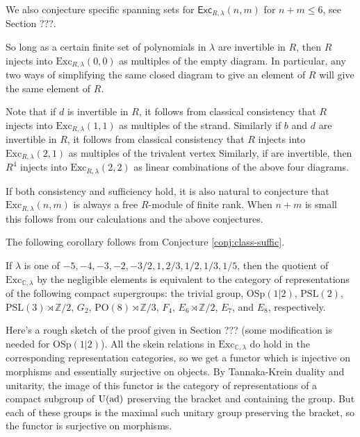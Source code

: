 \documentclass[12pt]{amsart}
\begin{document}
We also conjecture specific spanning sets for $\mathsf{Exc}_{R,\lambda}(n,m)$ for $n+m \leq 6$, see Section ???.

\begin{conjecture}
  \label{conj:class-consist}
So long as a certain finite set of polynomials in $\lambda$ are invertible in $R$, then $R$ injects into $\mathrm{Exc}_{R,\lambda}(0,0)$ as multiples of the empty diagram.  In particular, any two ways of simplifying the same closed diagram to give an element of $R$ will give the same element of $R$.
\end{conjecture}

Note that if $d$ is invertible in $R$, it follows from classical consistency that $R$ injects into $\mathrm{Exc}_{R,\lambda}(1,1)$ as multiples of the strand.  Similarly if $b$ and $d$ are invertible in $R$, it follows from classical consistency that $R$ injects into $\mathrm{Exc}_{R,\lambda}(2,1)$ as multiples of the trivalent vertex  Similarly, if  are invertible, then $R^4$ injects into $\mathrm{Exc}_{R,\lambda}(2,2)$ as linear combinations of the above four diagrams.


If both consistency and sufficiency hold, it is also natural to conjecture that $\mathrm{Exc}_{R,\lambda}(n,m)$ is always a free $R$-module of finite rank.  When $n+m$ is small this follows from our calculations and the above conjectures.

The following corollary follows from Conjecture \ref{conj:class-suffic}.

\begin{corollary}
If $\lambda$ is one of $-5, -4, -3, -2, -3/2,1,2/3,1/2, 1/3, 1/5$, then the quotient of $\mathrm{Exc}_{\mathbb{C},\lambda}$ by the negligible elements is equivalent to the category of representations of the following compact supergroups: the trivial group, $\mathrm{OSp}(1 | 2)$, $\mathrm{PSL}(2)$, $\mathrm{PSL}(3) \rtimes \mathbb{Z}/2$, $G_2$, $\mathrm{PO}(8) \rtimes \mathbb{Z}/3$, $F_4$, $E_6 \rtimes \mathbb{Z}/2$, $E_7$, and $E_8$, respectively.
\end{corollary}

Here's a rough sketch of the proof given in Section ??? (some modification is needed for $\mathrm{OSp}(1|2)$).  All the skein relations in $\mathrm{Exc}_{\mathbb{C},\lambda}$ do hold in the corresponding representation categories, so we get a functor which is injective on morphisms and essentially surjective on objects.  By Tannaka-Krein duality and unitarity, the image of this functor is the category of representations of a compact subgroup of $\mathrm{U}(\operatorname{ad})$ preserving the bracket and containing the group.  But each of these groups is the maximal such unitary group preserving the bracket, so the functor is surjective on morphisms.  
\end{document}
